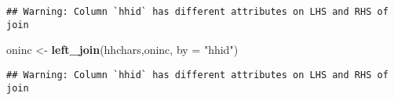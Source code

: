 \documentclass[
]{article}
\newenvironment{Shaded}{\begin{snugshade}}{\end{snugshade}}
\newcommand{\CommentTok}[1]{\textcolor[rgb]{0.56,0.35,0.01}{\textit{#1}}}
\newcommand{\DataTypeTok}[1]{\textcolor[rgb]{0.13,0.29,0.53}{#1}}
\newcommand{\DecValTok}[1]{\textcolor[rgb]{0.00,0.00,0.81}{#1}}
\newcommand{\KeywordTok}[1]{\textcolor[rgb]{0.13,0.29,0.53}{\textbf{#1}}}
\newcommand{\NormalTok}[1]{#1}
\newcommand{\OperatorTok}[1]{\textcolor[rgb]{0.81,0.36,0.00}{\textbf{#1}}}
\newcommand{\StringTok}[1]{\textcolor[rgb]{0.31,0.60,0.02}{#1}}
\begin{document}
\begin{Shaded}
\end{Shaded}

\begin{verbatim}
## Warning: Column `hhid` has different attributes on LHS and RHS of join
\end{verbatim}

\begin{Shaded}
\begin{Highlighting}[]
\NormalTok{oninc <-}\StringTok{ }\KeywordTok{left_join}\NormalTok{(hhchars,oninc,  }\DataTypeTok{by =} \StringTok{"hhid"}\NormalTok{)}
\end{Highlighting}
\end{Shaded}

\begin{verbatim}
## Warning: Column `hhid` has different attributes on LHS and RHS of join
\end{verbatim}
\end{document}
